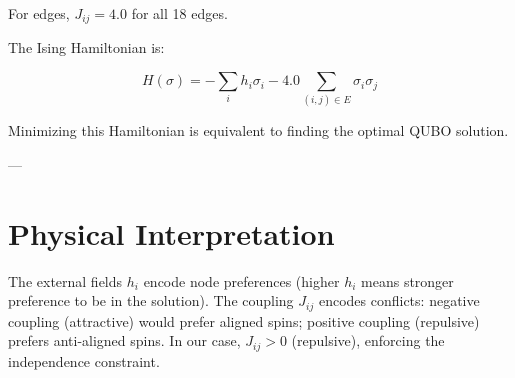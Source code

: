For edges, $J_{ij} = 4.0$ for all 18 edges.

The Ising Hamiltonian is:

\begin{equation}
H(\sigma) = -\sum_i h_i \sigma_i - 4.0 \sum_{(i,j) \in E} \sigma_i \sigma_j
\end{equation}

Minimizing this Hamiltonian is equivalent to finding the optimal QUBO solution.

---

\section{Physical Interpretation}

The external fields $h_i$ encode node preferences (higher $h_i$ means stronger preference to be in the solution). The coupling $J_{ij}$ encodes conflicts: negative coupling (attractive) would prefer aligned spins; positive coupling (repulsive) prefers anti-aligned spins. In our case, $J_{ij} > 0$ (repulsive), enforcing the independence constraint.
